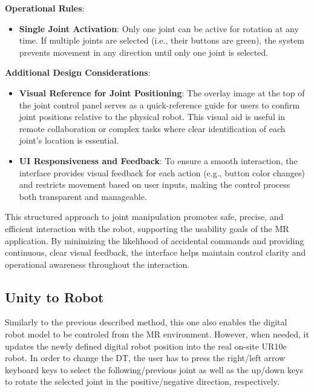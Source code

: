 \textbf{Operational Rules}:
\begin{itemize}
    \item \textbf{Single Joint Activation}: Only one joint can be active for rotation at any time. If multiple joints are selected (i.e., their buttons are green), the system prevents movement in any direction until only one joint is selected.

\end{itemize}

\textbf{Additional Design Considerations}:
\begin{itemize}
    \item \textbf{Visual Reference for Joint Positioning}: The overlay image at the top of the joint control panel serves as a quick-reference guide for users to confirm joint positions relative to the physical robot. This visual aid is useful in remote collaboration or complex tasks where clear identification of each joint’s location is essential.

    \item \textbf{UI Responsiveness and Feedback}: To ensure a smooth interaction, the interface provides visual feedback for each action (e.g., button color changes) and restricts movement based on user inputs, making the control process both transparent and manageable.
\end{itemize}

This structured approach to joint manipulation promotes safe, precise, and efficient interaction with the robot, supporting the usability goals of the \ac{MR} application. By minimizing the likelihood of accidental commands and providing continuous, clear visual feedback, the interface helps maintain control clarity and operational awareness throughout the interaction.


\subsection{Unity to Robot}
Similarly to the previous described method, this one also enables the digital robot model to be controled from the \ac{MR} environment. However, when needed, it updates the newly defined digital robot position into the real on-site UR10e robot. In order to change the \ac{DT}, the user has to press the right/left arrow keyboard keys to select the following/previous joint as well as the up/down keys to rotate the selected joint in the positive/negative direction, respectively.
        
